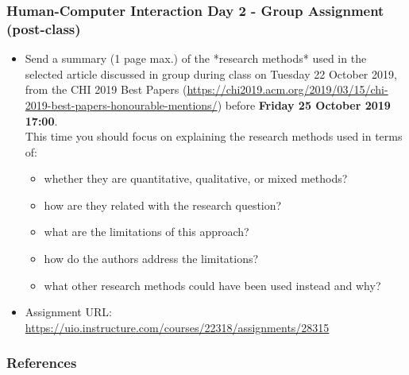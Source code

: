 \documentclass[screen, aspectratio=169]{beamer}
\begin{document}
%
\begin{frame}
\frametitle{Human-Computer Interaction Day 2 - Group Assignment (post-class)}
\begin{itemize}
\item Send a summary (1 page max.)  of the *research methods* used in the selected article discussed in group during class on Tuesday 22 October 2019, from the CHI 2019 Best Papers (\url{https://chi2019.acm.org/2019/03/15/chi-2019-best-papers-honourable-mentions/}) before \textbf{Friday 25 October 2019 17:00}.  \\
This time you should focus on explaining the research methods used in terms of:
\begin{itemize} 
\item whether they are quantitative, qualitative, or mixed methods?
\item how are they related with the research question?
\item what are the limitations of this approach?
\item how do the authors address the limitations? 
\item what other research methods could have been used instead and why?
\end{itemize}
\item Assignment URL: \url{https://uio.instructure.com/courses/22318/assignments/28315}
\end{itemize}
\end{frame}
%
\begin{frame}[shrink=20]
  \frametitle{References}
  \printbibliography
\end{frame}
%
\end{document}
